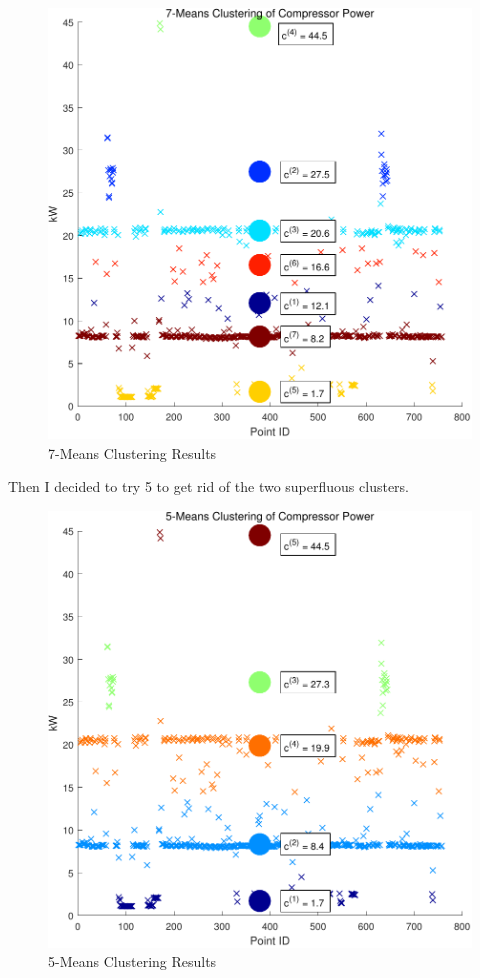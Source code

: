 \begin{figure}
\includegraphics[width = \columnwidth]{./Images/7MeansClustering.pdf}
\caption{7-Means Clustering Results}
\label{fig:7meansclustering}
\end{figure}

Then I decided to try 5 to get rid of the two superfluous clusters.

\begin{figure}
\includegraphics[width = \columnwidth]{./Images/5MeansClustering.pdf}
\caption{5-Means Clustering Results}
\label{fig:5meansclustering}
\end{figure}



